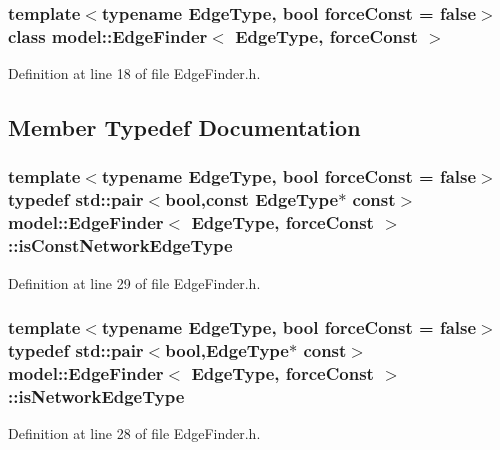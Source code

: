 \subsubsection*{template$<$typename Edge\+Type, bool force\+Const = false$>$class model\+::\+Edge\+Finder$<$ Edge\+Type, force\+Const $>$}



Definition at line 18 of file Edge\+Finder.\+h.



\subsection{Member Typedef Documentation}
\hypertarget{classmodel_1_1_edge_finder_a7540ff799b6bec42eb8d97aca320b398}{}
\subsubsection[{is\+Const\+Network\+Edge\+Type}]{\setlength{\rightskip}{0pt plus 5cm}template$<$typename Edge\+Type, bool force\+Const = false$>$ typedef std\+::pair$<$bool,const Edge\+Type$\ast$ const$>$ {\bf model\+::\+Edge\+Finder}$<$ Edge\+Type, force\+Const $>$\+::{\bf is\+Const\+Network\+Edge\+Type}}\label{classmodel_1_1_edge_finder_a7540ff799b6bec42eb8d97aca320b398}


Definition at line 29 of file Edge\+Finder.\+h.

\hypertarget{classmodel_1_1_edge_finder_a86f4f60cced5f7a8865b9325c7f73a73}{}
\subsubsection[{is\+Network\+Edge\+Type}]{\setlength{\rightskip}{0pt plus 5cm}template$<$typename Edge\+Type, bool force\+Const = false$>$ typedef std\+::pair$<$bool,Edge\+Type$\ast$ const$>$ {\bf model\+::\+Edge\+Finder}$<$ Edge\+Type, force\+Const $>$\+::{\bf is\+Network\+Edge\+Type}}\label{classmodel_1_1_edge_finder_a86f4f60cced5f7a8865b9325c7f73a73}


Definition at line 28 of file Edge\+Finder.\+h.



